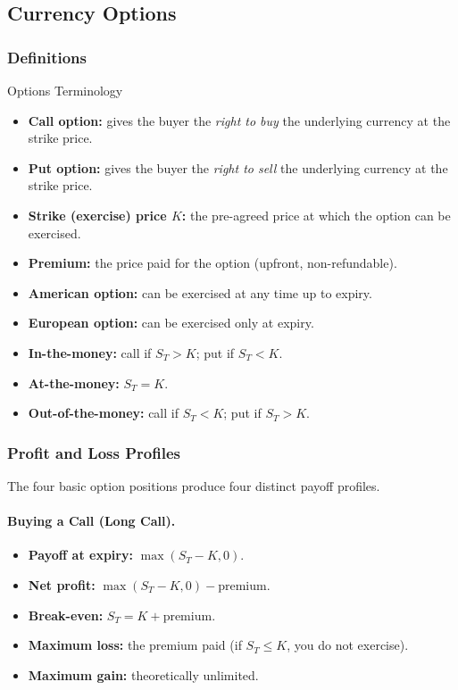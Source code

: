\documentclass[11pt,a4paper]{article}
\begin{document}
\subsection{Currency Options}

\subsubsection{Definitions}

\begin{conceptbox}{Options Terminology}
\begin{itemize}
  \item \textbf{Call option:} gives the buyer the \textit{right to buy} the underlying currency at the strike price.
  \item \textbf{Put option:} gives the buyer the \textit{right to sell} the underlying currency at the strike price.
  \item \textbf{Strike (exercise) price $K$:} the pre-agreed price at which the option can be exercised.
  \item \textbf{Premium:} the price paid for the option (upfront, non-refundable).
  \item \textbf{American option:} can be exercised at any time up to expiry.
  \item \textbf{European option:} can be exercised only at expiry.
  \item \textbf{In-the-money:} call if $S_T > K$; put if $S_T < K$.
  \item \textbf{At-the-money:} $S_T = K$.
  \item \textbf{Out-of-the-money:} call if $S_T < K$; put if $S_T > K$.
\end{itemize}
\end{conceptbox}

\subsubsection{Profit and Loss Profiles}

The four basic option positions produce four distinct payoff profiles.

\paragraph{Buying a Call (Long Call).}
\begin{itemize}
  \item \textbf{Payoff at expiry:} $\max(S_T - K, 0)$.
  \item \textbf{Net profit:} $\max(S_T - K, 0) - \text{premium}$.
  \item \textbf{Break-even:} $S_T = K + \text{premium}$.
  \item \textbf{Maximum loss:} the premium paid (if $S_T \leq K$, you do not exercise).
  \item \textbf{Maximum gain:} theoretically unlimited.
\end{itemize}
\end{document}
